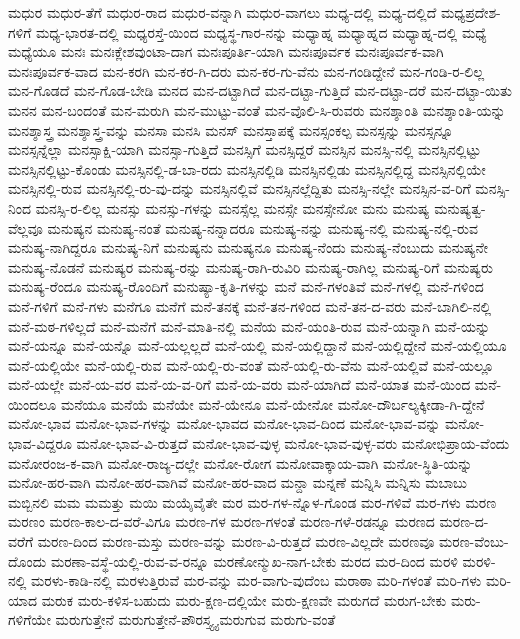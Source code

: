{ಮಧುರ
ಮಧುರ-ತೆಗೆ
ಮಧುರ-ರಾದ
ಮಧುರ-ವನ್ನಾಗಿ
ಮಧುರ-ವಾಗಲು
ಮಧ್ಯ-ದಲ್ಲಿ
ಮಧ್ಯ-ದಲ್ಲಿದೆ
ಮಧ್ಯಪ್ರದೇಶ-ಗಳಿಗೆ
ಮಧ್ಯ-ಭಾರತ-ದಲ್ಲಿ
ಮಧ್ಯರಸ್ತೆ-ಯಿಂದ
ಮಧ್ಯಸ್ಥ-ಗಾರ-ನನ್ನು
ಮಧ್ಯಾಹ್ನ
ಮಧ್ಯಾಹ್ನದ
ಮಧ್ಯಾಹ್ನ-ದಲ್ಲಿ
ಮಧ್ಯೆ
ಮಧ್ಯೆಯೂ
ಮನಃ
ಮನಃಕ್ಲೇಶವುಂಟಾ-ದಾಗ
ಮನಃಪೂರ್ತಿ-ಯಾಗಿ
ಮನಃಪೂರ್ವಕ
ಮನಃಪೂರ್ವಕ-ವಾಗಿ
ಮನಃಪೂರ್ವಕ-ವಾದ
ಮನ-ಕರಗಿ
ಮನ-ಕರ-ಗಿ-ದರು
ಮನ-ಕರ-ಗು-ವೆನು
ಮನ-ಗಂಡಿದ್ದೇನೆ
ಮನ-ಗಂಡಿ-ರ-ಲಿಲ್ಲ
ಮನ-ಗೊಡದೆ
ಮನ-ಗೊಡ-ಬೇಡಿ
ಮನದ
ಮನ-ದಟ್ಟಾಗಿದೆ
ಮನ-ದಟ್ಟಾ-ಗುತ್ತಿದೆ
ಮನ-ದಟ್ಟಾ-ದರೆ
ಮನ-ದಟ್ಟಾ-ಯಿತು
ಮನನ
ಮನ-ಬಂದಂತೆ
ಮನ-ಮರುಗಿ
ಮನ-ಮುಟ್ಟು-ವಂತೆ
ಮನ-ವೊಲಿ-ಸಿ-ರುವರು
ಮನಶ್ಶಾಂತಿ
ಮನಶ್ಶಾಂತಿ-ಯನ್ನು
ಮನಶ್ಶಾಸ್ತ್ರ
ಮನಶ್ಶಾಸ್ತ್ರ-ವನ್ನು
ಮನಸಾ
ಮನಸಿ
ಮನಸ್
ಮನಸ್ತಾಪಕ್ಕೆ
ಮನಸ್ಸಂಕಲ್ಪ
ಮನಸ್ಸನ್ನು
ಮನಸ್ಸನ್ನೂ
ಮನಸ್ಸನ್ನೆಲ್ಲಾ
ಮನಸ್ಸಾಕ್ಷಿ-ಯಾಗಿ
ಮನಸ್ಸಾ-ಗುತ್ತಿದೆ
ಮನಸ್ಸಿಗೆ
ಮನಸ್ಸಿದ್ದರೆ
ಮನಸ್ಸಿನ
ಮನಸ್ಸಿ-ನಲ್ಲಿ
ಮನಸ್ಸಿನಲ್ಲಿಟ್ಟು
ಮನಸ್ಸಿನಲ್ಲಿಟ್ಟು-ಕೊಂಡು
ಮನಸ್ಸಿನಲ್ಲಿ-ಡ-ಬಾ-ರದು
ಮನಸ್ಸಿನಲ್ಲಿಡಿ
ಮನಸ್ಸಿನಲ್ಲಿಡು
ಮನಸ್ಸಿನಲ್ಲಿದ್ದ
ಮನಸ್ಸಿನಲ್ಲಿಯೇ
ಮನಸ್ಸಿನಲ್ಲಿ-ರುವ
ಮನಸ್ಸಿನಲ್ಲಿ-ರು-ವು-ದನ್ನು
ಮನಸ್ಸಿನಲ್ಲಿವೆ
ಮನಸ್ಸಿನಲ್ಲೆದ್ದಿತು
ಮನಸ್ಸಿ-ನಲ್ಲೇ
ಮನಸ್ಸಿನ-ವ-ರಿಗೆ
ಮನಸ್ಸಿ-ನಿಂದ
ಮನಸ್ಸಿ-ರ-ಲಿಲ್ಲ
ಮನಸ್ಸು
ಮನಸ್ಸು-ಗಳನ್ನು
ಮನಸ್ಸೆಲ್ಲ
ಮನಸ್ಸೇ
ಮನಸ್ಸೇನೋ
ಮನು
ಮನುಷ್ಯ
ಮನುಷ್ಯತ್ವ-ವೆಲ್ಲವೂ
ಮನುಷ್ಯನ
ಮನುಷ್ಯ-ನಂತೆ
ಮನುಷ್ಯ-ನನ್ನಾದರೂ
ಮನುಷ್ಯ-ನನ್ನು
ಮನುಷ್ಯ-ನಲ್ಲಿ
ಮನುಷ್ಯ-ನಲ್ಲಿ-ರುವ
ಮನುಷ್ಯ-ನಾಗಿದ್ದರೂ
ಮನುಷ್ಯ-ನಿಗೆ
ಮನುಷ್ಯನು
ಮನುಷ್ಯನೂ
ಮನುಷ್ಯ-ನೆಂದು
ಮನುಷ್ಯ-ನೆಂಬುದು
ಮನುಷ್ಯನೇ
ಮನುಷ್ಯ-ನೊಡನೆ
ಮನುಷ್ಯರ
ಮನುಷ್ಯ-ರನ್ನು
ಮನುಷ್ಯ-ರಾಗಿ-ರುವಿರಿ
ಮನುಷ್ಯ-ರಾಗಿಲ್ಲ
ಮನುಷ್ಯ-ರಿಗೆ
ಮನುಷ್ಯರು
ಮನುಷ್ಯ-ರೆಂದೂ
ಮನುಷ್ಯ-ರೊಂದಿಗೆ
ಮನುಷ್ಯಾ-ಕೃತಿ-ಗಳನ್ನು
ಮನೆ
ಮನೆ-ಗಳಂತಿವೆ
ಮನೆ-ಗಳಲ್ಲಿ
ಮನೆ-ಗಳಿಂದ
ಮನೆ-ಗಳಿಗೆ
ಮನೆ-ಗಳು
ಮನೆಗೂ
ಮನೆಗೆ
ಮನೆ-ತನಕ್ಕೆ
ಮನೆ-ತನ-ಗಳಿಂದ
ಮನೆ-ತನ-ದ-ವರು
ಮನೆ-ಬಾಗಿಲಿ-ನಲ್ಲಿ
ಮನೆ-ಮಠ-ಗಳಿಲ್ಲದೆ
ಮನೆ-ಮನೆಗೆ
ಮನೆ-ಮಾತಿ-ನಲ್ಲಿ
ಮನೆಯ
ಮನೆ-ಯಂತಿ-ರುವ
ಮನೆ-ಯನ್ನಾಗಿ
ಮನೆ-ಯನ್ನು
ಮನೆ-ಯನ್ನೂ
ಮನೆ-ಯನ್ನೊ
ಮನೆ-ಯಲ್ಲಲ್ಲದೆ
ಮನೆ-ಯಲ್ಲಿ
ಮನೆ-ಯಲ್ಲಿದ್ದಾನೆ
ಮನೆ-ಯಲ್ಲಿದ್ದೇನೆ
ಮನೆ-ಯಲ್ಲಿಯೂ
ಮನೆ-ಯಲ್ಲಿಯೇ
ಮನೆ-ಯಲ್ಲಿ-ರುವ
ಮನೆ-ಯಲ್ಲಿ-ರು-ವಂತೆ
ಮನೆ-ಯಲ್ಲಿ-ರು-ವೆನು
ಮನೆ-ಯಲ್ಲಿವೆ
ಮನೆ-ಯಲ್ಲೂ
ಮನೆ-ಯಲ್ಲೇ
ಮನೆ-ಯ-ವರ
ಮನೆ-ಯ-ವ-ರಿಗೆ
ಮನೆ-ಯ-ವರು
ಮನೆ-ಯಾಗಿದೆ
ಮನೆ-ಯಾತ
ಮನೆ-ಯಿಂದ
ಮನೆ-ಯಿಂದಲೂ
ಮನೆಯೂ
ಮನೆಯೆ
ಮನೆಯೇ
ಮನೆ-ಯೇನೂ
ಮನೆ-ಯೇನೋ
ಮನೋ-ದೌರ್ಬಲ್ಯಕ್ಕೀಡಾ-ಗಿ-ದ್ದೇನೆ
ಮನೋ-ಭಾವ
ಮನೋ-ಭಾವ-ಗಳನ್ನು
ಮನೋ-ಭಾವದ
ಮನೋ-ಭಾವ-ದಿಂದ
ಮನೋ-ಭಾವ-ವನ್ನು
ಮನೋ-ಭಾವ-ವಿದ್ದರೂ
ಮನೋ-ಭಾವ-ವಿ-ರುತ್ತದೆ
ಮನೋ-ಭಾವ-ವುಳ್ಳ
ಮನೋ-ಭಾವ-ವುಳ್ಳ-ವರು
ಮನೋಭಿಪ್ರಾಯ-ವೆಂದು
ಮನೋರಂಜ-ಕ-ವಾಗಿ
ಮನೋ-ರಾಜ್ಯ-ದಲ್ಲೇ
ಮನೋ-ರೋಗ
ಮನೋವಾಕ್ಕಾಯ-ವಾಗಿ
ಮನೋ-ಸ್ಥಿತಿ-ಯನ್ನು
ಮನೋ-ಹರ-ವಾಗಿ
ಮನೋ-ಹರ-ವಾಗಿವೆ
ಮನೋ-ಹರ-ವಾದ
ಮನ್ದಾ
ಮನ್ನಣೆ
ಮನ್ನಿಸಿ
ಮನ್ನಿಸು
ಮಬಾಬು
ಮಬ್ಬಿನಲಿ
ಮಮ
ಮಮತ್ತು
ಮಯಿ
ಮಯೈವೈತೇ
ಮರ
ಮರ-ಗಳ-ನ್ನೊಳ-ಗೊಂಡ
ಮರ-ಗಳಿವೆ
ಮರ-ಗಳು
ಮರಣ
ಮರಣಂ
ಮರಣ-ಕಾಲ-ದ-ವರೆ-ವಿಗೂ
ಮರಣ-ಗಳ
ಮರಣ-ಗಳಂತೆ
ಮರಣ-ಗಳೆ-ರಡನ್ನೂ
ಮರಣದ
ಮರಣ-ದ-ವರೆಗೆ
ಮರಣ-ದಿಂದ
ಮರಣ-ಮಸ್ತು
ಮರಣ-ವನ್ನು
ಮರಣ-ವಿ-ರುತ್ತದೆ
ಮರಣ-ವಿಲ್ಲದೇ
ಮರಣವೂ
ಮರಣ-ವೆಂಬು-ದೊಂದು
ಮರಣಾ-ವಸ್ಥೆ-ಯಲ್ಲಿ-ರುವ-ವ-ರನ್ನೂ
ಮರಣೋನ್ಮುಖ-ನಾಗ-ಬೇಕು
ಮರದ
ಮರ-ದಿಂದ
ಮರಳಿ
ಮರಳಿ-ನಲ್ಲಿ
ಮರಳು-ಕಾಡಿ-ನಲ್ಲಿ
ಮರಳುತ್ತಿರುವೆ
ಮರ-ವನ್ನು
ಮರ-ವಾಗು-ವುದೆಂಬ
ಮರಾಠಾ
ಮರಿ-ಗಳಂತೆ
ಮರಿ-ಗಳು
ಮರಿ-ಯಾದ
ಮರುಕ
ಮರು-ಕಳಿಸ-ಬಹುದು
ಮರು-ಕ್ಷಣ-ದಲ್ಲಿಯೇ
ಮರು-ಕ್ಷಣವೇ
ಮರುಗದೆ
ಮರುಗ-ಬೇಕು
ಮರು-ಗಳಿಗೆಯೇ
ಮರುಗುತ್ತೇನೆ
ಮರುಗುತ್ತೇನೆ-ಪೌರಸ್ತ್ಯ್ಯ
ಮರುಗುವ
ಮರುಗು-ವಂತೆ
}
